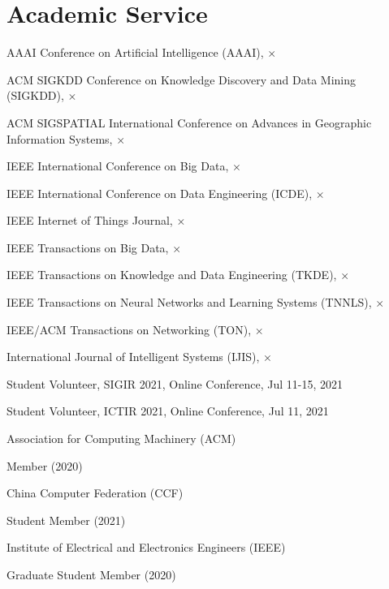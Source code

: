 \section*{Academic Service}


\indent

AAAI Conference on Artificial Intelligence (AAAI), $\times$

ACM SIGKDD Conference on Knowledge Discovery and Data Mining (SIGKDD), $\times$

ACM SIGSPATIAL International Conference on Advances in Geographic Information Systems, $\times$

IEEE International Conference on Big Data, $\times$

IEEE International Conference on Data Engineering (ICDE), $\times$

IEEE Internet of Things Journal, $\times$

IEEE Transactions on Big Data, $\times$

IEEE Transactions on Knowledge and Data Engineering (TKDE), $\times$

IEEE Transactions on Neural Networks and Learning Systems (TNNLS), $\times$

IEEE/ACM Transactions on Networking (TON), $\times$

International Journal of Intelligent Systems (IJIS), $\times$

\indent 

Student Volunteer, SIGIR 2021, Online Conference, Jul 11-15, 2021

Student Volunteer, ICTIR 2021, Online Conference, Jul 11, 2021

\indent 

Association for Computing Machinery (ACM)  

\hspace{2em}Member (2020)

China Computer Federation (CCF)

\hspace{2em}Student Member (2021)

Institute of Electrical and Electronics Engineers (IEEE)

\hspace{2em}Graduate Student Member (2020)